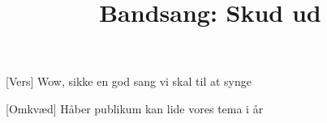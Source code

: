 \documentclass[a4paper,11pt]{article}
\title{Bandsang: Skud ud}
\begin{document}
\maketitle

\begin{song}
[Vers] Wow, sikke en god sang vi skal til at synge

[Omkvæd] Håber publikum kan lide vores tema i år
\end{song}
\end{document}
